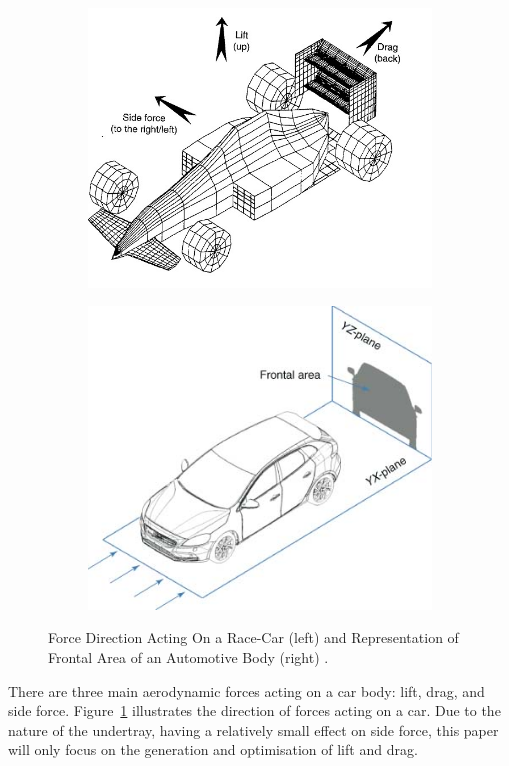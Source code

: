 \begin{figure}[!h]
\begin{center}
%    
  \begin{subfigure}[b]{0.4\textwidth}
    \includegraphics[scale=0.4]{Figures/race_car_forces.jpg}
  \end{subfigure}
  \begin{subfigure}[b]{0.4\textwidth}
    \includegraphics[scale=0.8]{Figures/frontal_area.jpg}
  \end{subfigure}
%  
  \caption{Force Direction Acting On a Race-Car (left) and Representation of Frontal Area of an Automotive Body (right) \cite{Sebben2014FundamentalsDesign}.}
    \label{fig:Force direction and frontal area}
\end{center}
\end{figure}
\noindent There are three main aerodynamic forces acting on a car body: lift, drag, and side force. Figure~\ref{fig:Force direction and frontal area} illustrates the direction of forces acting on a car. Due to the nature of the undertray, having a relatively small effect on side force, this paper will only focus on the generation and optimisation of lift and drag.

